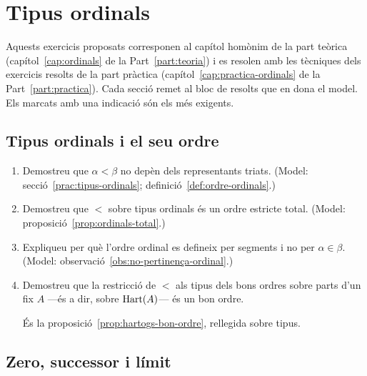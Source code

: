 \chapter{Tipus ordinals}\label{cap:exercicis-ordinals}

Aquests exercicis proposats corresponen al capítol homònim de la part teòrica (capítol~\ref{cap:ordinals} de la Part~\ref{part:teoria}) i es resolen amb les tècniques dels exercicis resolts de la part pràctica (capítol~\ref{cap:practica-ordinals} de la Part~\ref{part:practica}). Cada secció remet al bloc de resolts que en dona el model. Els marcats amb una indicació són els més exigents.

\section{Tipus ordinals i el seu ordre}

\begin{enumerate}
  \item Demostreu que \(\alpha<\beta\) no depèn dels representants triats. (Model: secció~\ref{prac:tipus-ordinals}; definició~\ref{def:ordre-ordinals}.)

  \item Demostreu que \(<\) sobre tipus ordinals és un ordre estricte total. (Model: proposició~\ref{prop:ordinals-total}.)

  \item Expliqueu per què l'ordre ordinal es defineix per segments i no per \(\alpha\in\beta\). (Model: observació~\ref{obs:no-pertinença-ordinal}.)

  \item Demostreu que la restricció de \(<\) als tipus dels bons ordres sobre parts d'un fix \(A\) ---és a dir, sobre \(\operatorname{Hart}(A)\)--- és un bon ordre. \begin{indicacio}És la proposició~\ref{prop:hartogs-bon-ordre}, rellegida sobre tipus.\end{indicacio}
\end{enumerate}

\section{Zero, successor i límit}

